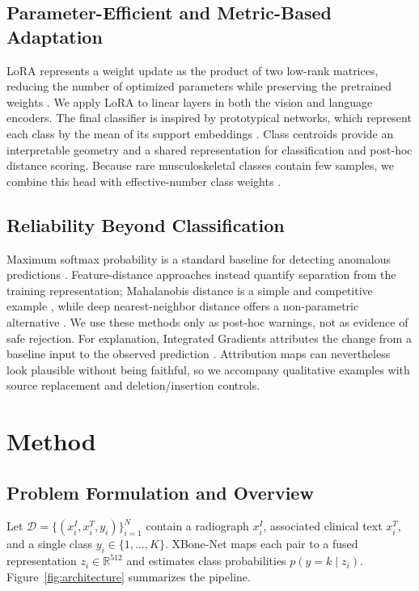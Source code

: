 \documentclass[runningheads]{llncs}
\begin{document}
\subsection{Parameter-Efficient and Metric-Based Adaptation}

LoRA represents a weight update as the product of two low-rank matrices, reducing the number of optimized parameters while preserving the pretrained weights \cite{Hu2022LoRA}. We apply LoRA to linear layers in both the vision and language encoders. The final classifier is inspired by prototypical networks, which represent each class by the mean of its support embeddings \cite{Snell2017ProtoNet}. Class centroids provide an interpretable geometry and a shared representation for classification and post-hoc distance scoring. Because rare musculoskeletal classes contain few samples, we combine this head with effective-number class weights \cite{Cui2019ClassBalanced}.

\subsection{Reliability Beyond Classification}

Maximum softmax probability is a standard baseline for detecting anomalous predictions \cite{Hendrycks2017MSP}. Feature-distance approaches instead quantify separation from the training representation; Mahalanobis distance is a simple and competitive example \cite{Lee2018MahalanobisOOD}, while deep nearest-neighbor distance offers a non-parametric alternative \cite{Sun2022KNN}. We use these methods only as post-hoc warnings, not as evidence of safe rejection. For explanation, Integrated Gradients attributes the change from a baseline input to the observed prediction \cite{Sundararajan2017IntegratedGradients}. Attribution maps can nevertheless look plausible without being faithful, so we accompany qualitative examples with source replacement and deletion/insertion controls.

\section{Method}

\subsection{Problem Formulation and Overview}

Let $\mathcal{D}=\{(x_i^{I},x_i^{T},y_i)\}_{i=1}^{N}$ contain a radiograph $x_i^{I}$, associated clinical text $x_i^{T}$, and a single class $y_i\in\{1,\ldots,K\}$. XBone-Net maps each pair to a fused representation $z_i\in\mathbb{R}^{512}$ and estimates class probabilities $p(y=k\mid z_i)$. Figure~\ref{fig:architecture} summarizes the pipeline.
\end{document}
